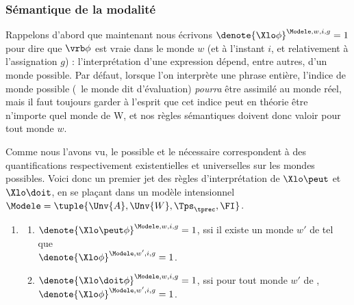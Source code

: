 \subsubsection{Sémantique de la modalité}
\label{modalflavours1}

Rappelons d'abord que maintenant nous écrivons \(\denote{\Xlo\phi}^{\Modele,w,i,g}=1\) pour
dire que $\vrb\phi$ est vraie dans le monde $w$ (et à l'instant $i$, et
relativement à l'assignation $g$) : l'interprétation d'une expression dépend, entre autres, d'un monde possible.  Par défaut, lorsque l'on interprète une phrase entière, l'indice de monde possible (\ie\ le monde dit d'évaluation) \emph{pourra} être assimilé au monde réel, mais il faut toujours garder à l'esprit que cet indice peut en théorie être n'importe quel monde de \Unv W, et nos règles sémantiques doivent donc valoir pour tout monde $w$.

Comme nous l'avons vu, le possible et le nécessaire correspondent à des quantifications respectivement existentielles et universelles sur les mondes possibles. Voici donc un premier jet des règles d'interprétation de $\Xlo\peut$ et $\Xlo\doit$, en se plaçant dans un modèle intensionnel \(\Modele =
\tuple{\Unv{A},\Unv{W},\Tps_{\tprec},\FI}\).


\begin{defi}\label{d:semMod1}
\begin{enumerate}[sem,resume=RglSem2] %
\item \label{RSemMod}
\begin{enumerate}
\item \(\denote{\Xlo\peut\phi}^{\Modele,w,i,g}=1\), ssi il existe un monde
$w'$ de {} 
tel que\\ \(\denote{\Xlo\phi}^{\Modele,w',i,g}=1\).
\item \(\denote{\Xlo\doit\phi}^{\Modele,w,i,g}=1\), ssi pour tout monde
  $w'$ de ,  \(\denote{\Xlo\phi}^{\Modele,w',i,g}=1\).
\end{enumerate}
\end{enumerate}
\end{defi}


